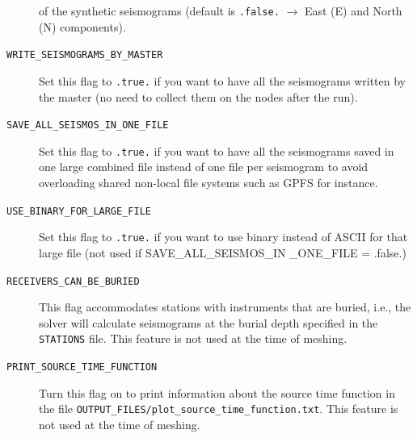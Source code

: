 \documentclass[oneside,english]{book}
\begin{document}
\begin{description}
of the synthetic seismograms (default is \texttt{.false.} $\rightarrow$
East (E) and North (N) components).
\item [{\texttt{WRITE\_SEISMOGRAMS\_BY\_MASTER}}] Set this flag to \texttt{.true.}
if you want to have all the seismograms written by the master (no
need to collect them on the nodes after the run).
\item [{\texttt{SAVE\_ALL\_SEISMOS\_IN\_ONE\_FILE}}] Set this flag to \texttt{.true.}
if you want to have all the seismograms saved in one large combined
file instead of one file per seismogram to avoid overloading shared
non-local file systems such as GPFS for instance.
\item [{\texttt{USE\_BINARY\_FOR\_LARGE\_FILE}}] Set this flag to \texttt{.true.}
if you want to use binary instead of ASCII for that large file (not
used if SAVE\_ALL\_SEISMOS\_IN \_ONE\_FILE = .false.)
\item [{\texttt{RECEIVERS\_CAN\_BE\_BURIED}}] This flag accommodates stations
with instruments that are buried, i.e., the solver will calculate
seismograms at the burial depth specified in the \texttt{STATIONS}
file. This feature is not used at the time of meshing.
\item [{\texttt{PRINT\_SOURCE\_TIME\_FUNCTION}}] Turn this flag on to print
information about the source time function in the file \texttt{OUTPUT\_FILES/plot\_source\_time\_function.txt}.
This feature is not used at the time of meshing.
\end{description}
%
\clearpage
\end{document}
